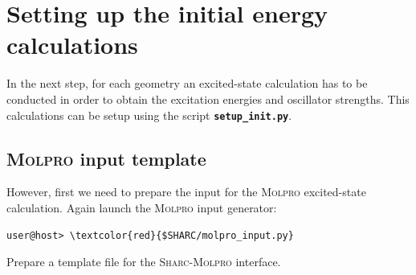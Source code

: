 \documentclass[a4paper,11pt,DIV=15,openany]{scrbook}
\newcommand{\sharc}{\textsc{Sharc}}
\newcommand{\ttt}[1]{\textbf{\texttt{#1}}}
\begin{document}
\clearpage
\section{Setting up the initial energy calculations}

In the next step, for each geometry an excited-state calculation has to be conducted in order to obtain the excitation energies and oscillator strengths. This calculations can be setup using the script \ttt{setup\_init.py}. 

\subsection{\textsc{Molpro} input template}

However, first we need to prepare the input for the \textsc{Molpro} excited-state calculation. Again launch the \textsc{Molpro} input generator:
\begin{Verbatim}[commandchars=\\\{\}]
user@host> \textcolor{red}{$SHARC/molpro_input.py}
\end{Verbatim}
Prepare a template file for the \sharc-\textsc{Molpro} interface.
\end{document}
